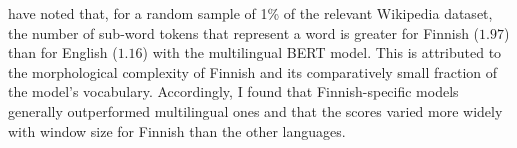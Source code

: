 

\textcites[3]{Virtanen2019} have noted that, for a random sample of 1\% of the relevant
Wikipedia dataset, the number of sub-word tokens that represent a word
is greater for Finnish ($1.97$) than for English ($1.16$) with the multilingual BERT model.
This is attributed to the morphological complexity of Finnish and its comparatively
small fraction of the model's vocabulary.
Accordingly, I found that Finnish-specific models generally outperformed multilingual
ones and that the scores varied more widely with window size for Finnish than the other
languages.

